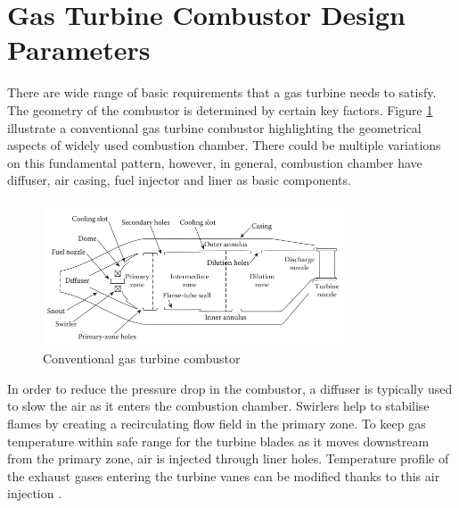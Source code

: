 \section{Gas Turbine Combustor Design Parameters}
There are wide range of basic requirements that a gas turbine needs to satisfy. The geometry of the combustor is determined by certain key factors. Figure \ref{fig:gasTurbineEngine} illustrate a conventional gas turbine combustor highlighting the geometrical aspects of widely used combustion chamber. There could be multiple variations on this fundamental pattern, however, in general, combustion chamber have diffuser, air casing, fuel injector and liner as basic components.
\begin{figure}[ht]
	\centering
	\includegraphics[width=0.8\textwidth]{Chapter1/Images/Conventional combustor.jpeg}
	\caption[Conventional gas turbine combustor.]{Conventional gas turbine combustor \cite{LTY2013}}
	\label{fig:gasTurbineEngine}
\end{figure}

In order to reduce the pressure drop in the combustor, a diffuser is typically used to slow the air as it enters the combustion chamber. Swirlers help to stabilise flames by creating a recirculating flow field in the primary zone. To keep gas temperature within safe range for the turbine blades as it moves downstream from the primary zone, air is injected through liner holes. Temperature profile of the exhaust gases entering the turbine vanes can be modified thanks to this air injection \cite{LAH2010}.


